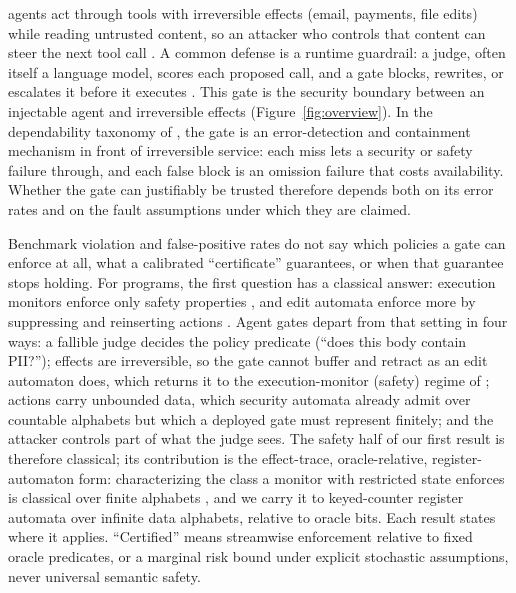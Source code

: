  agents act through tools with irreversible effects (email,
payments, file edits) while reading untrusted content, so an attacker who
controls that content can steer the next tool call
\citep{greshake2023injection}. A common defense is a runtime guardrail: a
judge, often itself a language model, scores each proposed call, and a gate
blocks, rewrites, or escalates it before it executes
\citep{inan2023llamaguard,chennabasappa2025llamafirewall,agentspec2026,probguard2025,veriguard2025,agentc2025,wu2026provably}.
This gate is the security boundary between an injectable agent and
irreversible effects (Figure~\ref{fig:overview}). In the dependability
taxonomy of \citet{avizienis2004basic}, the gate is an error-detection and containment
mechanism in front of irreversible service: each miss lets a security or safety failure
through, and each false block is an omission failure that costs availability. Whether the
gate can justifiably be trusted therefore depends both on its error rates and on the fault
assumptions under which they are claimed.


Benchmark violation and false-positive rates do not say which policies a
gate can enforce at all, what a calibrated ``certificate'' guarantees, or
when that guarantee stops holding. For programs, the first question has a
classical answer: execution
monitors enforce only safety properties \citep{schneider2000enforceable}, and edit
automata enforce more by suppressing and reinserting actions
\citep{ligatti2005edit}. Agent gates depart from that setting in four ways: a fallible judge
decides the policy predicate (``does this body contain PII?''); effects are
irreversible, so the gate cannot buffer and retract as an edit automaton does, which
returns it to the execution-monitor (safety) regime of \citet{schneider2000enforceable};
actions carry unbounded data, which security automata already admit over countable
alphabets but which a deployed gate must represent finitely; and the attacker controls
part of what the judge sees. The safety half of our first result is therefore classical;
its contribution is the effect-trace, oracle-relative, register-automaton form:
characterizing the class a monitor with restricted state enforces is classical over finite
alphabets \citep{fong2004shallow,talhi2008memory}, and we carry it to keyed-counter register
automata over infinite data alphabets, relative to oracle bits. Each result states where it applies. ``Certified'' means
streamwise enforcement relative to fixed oracle predicates, or a marginal risk
bound under explicit stochastic assumptions, never universal semantic safety.

